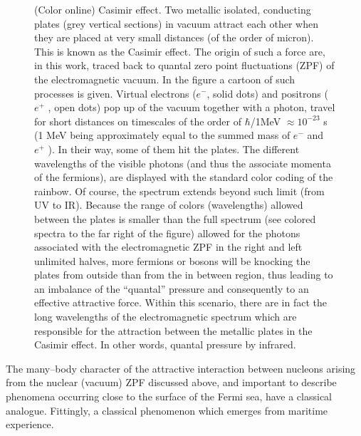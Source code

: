 \begin{subappendices}
\begin{figure}
\caption{(Color online) Casimir effect. Two metallic isolated, conducting plates (grey vertical sections) in vacuum attract
each other when they are placed at very small distances (of the order of micron). This is known as the
Casimir effect. The origin of such a force
are, in this work, traced back to quantal zero point fluctuations (ZPF) of the electromagnetic vacuum. In
the figure a cartoon of such processes is given. Virtual electrons ($e^-$, solid dots) and positrons ($e^+$ , open
dots) pop up of the vacuum together with a photon, travel for short distances on timescales of the order
of $\hbar$/1MeV $\approx10^{-23}$  s (1 MeV being approximately equal to the summed mass of $e^-$ and $e^+$ ). In their
way, some of them hit the plates. The different wavelengths of the visible photons (and thus the associate
momenta of the fermions), are displayed with the standard color coding of the rainbow. Of course, the
spectrum extends beyond such limit (from UV to IR). Because the range of colors (wavelengths) allowed between
the plates is smaller than the full spectrum (see colored spectra to the far right of the figure) allowed for
the photons associated with the electromagnetic ZPF in the right and left unlimited halves, more fermions
or bosons will be knocking the plates from outside than from the in between region, thus leading to an imbalance of
the ``quantal'' pressure and consequently to an effective attractive force. Within this scenario, there are in fact the long wavelengths of the electromagnetic spectrum which are responsible for the attraction between the metallic plates in the Casimir effect. In other words, quantal pressure by infrared.}\label{fig6G3}
\end{figure}
The many--body character of the attractive interaction between nucleons arising from the nuclear (vacuum) ZPF discussed above, and important to describe phenomena occurring close to the surface of the Fermi sea, have a classical analogue. Fittingly, a classical phenomenon which emerges from maritime experience. 



\end{subappendices}
